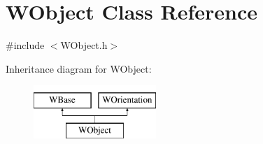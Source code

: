 \hypertarget{class_w_object}{}\section{W\+Object Class Reference}
\label{class_w_object}


{\ttfamily \#include $<$W\+Object.\+h$>$}

Inheritance diagram for W\+Object\+:\begin{figure}[H]
\begin{center}
\leavevmode
\includegraphics[height=2.000000cm]{class_w_object}
\end{center}
\end{figure}
